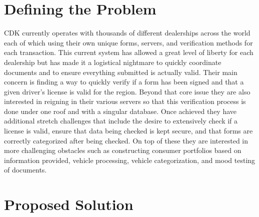 \documentclass[onecolumn, draftclsnofoot,10pt, compsoc]{IEEEtran}
\begin{document}
\newpage
{}
\tableofcontents
\clearpage

\section{Defining the Problem}
	
	CDK currently operates with thousands of different dealerships across the world each of which using their own unique forms, servers, and verification methods for each transaction. This current system has allowed a great level of liberty for each dealership but has made it a logistical nightmare to quickly coordinate documents and to ensure everything submitted is actually valid. Their main concern is finding a way to quickly verify if a form has been signed and that a given driver’s license is valid for the region. Beyond that core issue they are also interested in reigning in their various servers so that this verification process is done under one roof and with a singular database. Once achieved they have additional stretch challenges that include the desire to extensively check if a license is valid, ensure that data being checked is kept secure, and that forms are correctly categorized after being checked. On top of these they are interested in more challenging obstacles such as constructing consumer portfolios based on information provided, vehicle processing, vehicle categorization, and mood testing of documents.
	
\section{Proposed Solution}
\end{document}
